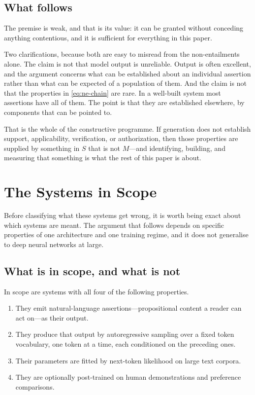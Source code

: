 \documentclass[11pt]{article}
\theoremstyle{plain}
\theoremstyle{definition}
\begin{document}
\subsection{What follows}

The premise is weak, and that is its value: it can be granted without conceding
anything contentious, and it is sufficient for everything in this paper.

Two clarifications, because both are easy to misread from the non-entailments
alone. The claim is not that model output is unreliable. Output is often excellent,
and the argument concerns what can be established about an individual assertion
rather than what can be expected of a population of them. And the claim is not that
the properties in \eqref{eq:ne-chain} are rare. In a well-built system most
assertions have all of them. The point is that they are established elsewhere, by
components that can be pointed to.

That is the whole of the constructive programme. If generation does not establish
support, applicability, verification, or authorization, then those properties are
supplied by something in $S$ that is not $M$---and identifying, building, and
measuring that something is what the rest of this paper is about.


\section{The Systems in Scope}
\label{sec:architecture}

Before classifying what these systems get wrong, it is worth being exact about
which systems are meant. The argument that follows depends on specific properties
of one architecture and one training regime, and it does not generalise to deep
neural networks at large.

\subsection{What is in scope, and what is not}
\label{sec:scope}

In scope are systems with all four of the following properties.

\begin{enumerate}
  \item They emit natural-language assertions---propositional content a reader can
        act on---as their output.
  \item They produce that output by autoregressive sampling over a fixed token
        vocabulary, one token at a time, each conditioned on the preceding ones.
  \item Their parameters are fitted by next-token likelihood on large text
        corpora.
  \item They are optionally post-trained on human demonstrations and preference
        comparisons.
\end{enumerate}
\end{document}
